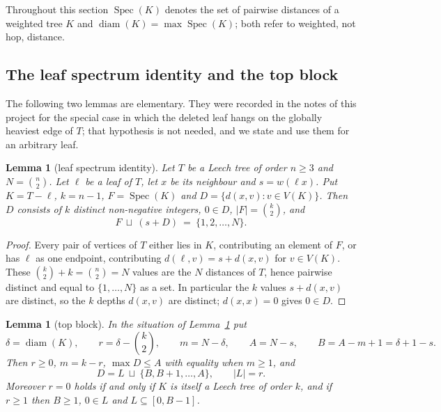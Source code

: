 \documentclass[11pt,a4paper]{article}
\theoremstyle{plain}
\newtheorem{lemma}[theorem]{Lemma}
\theoremstyle{remark}
\newcommand{\bin}[2]{\binom{#1}{#2}}
\newcommand{\diam}{\operatorname{diam}}
\newcommand{\Spec}{\operatorname{Spec}}
\begin{document}
Throughout this section $\Spec(K)$ denotes the set of pairwise distances of a
weighted tree $K$ and $\diam(K)=\max\Spec(K)$; both refer to weighted, not hop,
distance.

\subsection{The leaf spectrum identity and the top block}\label{sec:leafid}

The following two lemmas are elementary.  They were recorded in the notes of
this project for the special case in which the deleted leaf hangs on the
globally heaviest edge of $T$; that hypothesis is not needed, and we state and
use them for an arbitrary leaf.

\begin{lemma}[leaf spectrum identity]\label{lem:leafspec}
Let $T$ be a Leech tree of order $n\ge 3$ and $N=\bin n2$.  Let $\ell$ be a leaf
of $T$, let $x$ be its neighbour and $s=w(\ell x)$.  Put $K=T-\ell$, $k=n-1$,
$F=\Spec(K)$ and $D=\{d(x,v):v\in V(K)\}$.  Then $D$ consists of $k$ distinct
non-negative integers, $0\in D$, $|F|=\bin k2$, and
\begin{equation}\label{eq:leafspec}
  F\ \sqcup\ (s+D)\ =\ \{1,2,\dots,N\}.
\end{equation}
\end{lemma}

\begin{proof}
Every pair of vertices of $T$ either lies in $K$, contributing an element of
$F$, or has $\ell$ as one endpoint, contributing $d(\ell,v)=s+d(x,v)$ for
$v\in V(K)$.  These $\bin k2+k=\bin n2=N$ values are the $N$ distances of $T$,
hence pairwise distinct and equal to $\{1,\dots,N\}$ as a set.  In particular
the $k$ values $s+d(x,v)$ are distinct, so the $k$ depths $d(x,v)$ are distinct;
$d(x,x)=0$ gives $0\in D$.
\end{proof}

\begin{lemma}[top block]\label{lem:topblock}
In the situation of Lemma~\ref{lem:leafspec} put
\[
  \delta=\diam(K),\qquad r=\delta-\bin k2,\qquad m=N-\delta,\qquad
  A=N-s,\qquad B=A-m+1=\delta+1-s .
\]
Then $r\ge0$, $m=k-r$, $\max D\le A$ with equality when $m\ge1$, and
\begin{equation}\label{eq:topblock}
  D=L\ \sqcup\ \{B,B+1,\dots,A\},\qquad |L|=r .
\end{equation}
Moreover $r=0$ holds if and only if $K$ is itself a Leech tree of order $k$, and
if $r\ge1$ then $B\ge1$, $0\in L$ and $L\subseteq[0,B-1]$.
\end{lemma}
\end{document}
